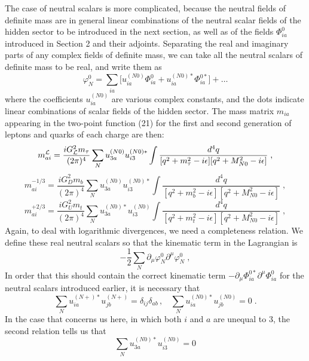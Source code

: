 The case of neutral scalars is more complicated, because the neutral fields  of definite mass are in general linear combinations of the neutral scalar fields of the hidden sector to be introduced in the next section, as well as of the fields $\Phi_{ia}^0$ introduced in Section 2 and their adjoints.  Separating the real and imaginary parts of any complex fields of definite mass, we can take all the neutral scalars of definite mass to be real, and write them as
\begin{equation}
  \varphi_N^0=\sum_{ia}\Big[u_{ia}^{(N0)} \Phi_{ia}^0+u_{ia}^{(N0)*} \Phi_{ia}^{0*}\Big]+\dots
\end{equation}
where the coefficients $u_{ia}^{(N0)}$ are various complex constants, and the dots indicate linear combinations of scalar fields of the hidden sector.
The mass matrix $m_{ia}$ appearing in the two-point function (21) for the first and second generation of leptons and quarks of each charge are then:
\begin{equation}
m^{\cal L}_{ai}=\frac{iG_{\cal L}^2m_\tau}{(2\pi)^4}\sum_{N}  u_{3a}^{(N0)}u_{i3}^{(N0)*} \int \frac{d^4q}{[q^2+m_\tau^2-i\epsilon][q^2+M_{N0}^2-i\epsilon]}\;,
\end{equation}
\begin{equation}
m^{-1/3}_{ai}=\frac{iG^2_Dm_b}{(2\pi)^4}\sum_{N}  u_{3a}^{(N0)}u_{i3}^{(N0)*} \int \frac{d^4q}{[q^2+m_b^2-i\epsilon][q^2+M_{N0}^2-i\epsilon]}\;,
\end{equation}
\begin{equation}
m^{+2/3}_{ai}=\frac{iG^2_Um_t}{(2\pi)^4}\sum_{N}  u_{3a}^{(N0)*}u_{i3}^{(N0)} \int \frac{d^4q}{[q^2+m_t^2-i\epsilon][q^2+M_{N0}^2-i\epsilon]}\;,
\end{equation}
Again, to deal with logarithmic divergences, we need a completeness relation.
We define these real neutral scalars so that the kinematic term
 in the Lagrangian is   
$$-\frac{1}{2}\sum_N\partial_\mu\varphi^{0}_N\partial^\mu\varphi^0_N\;,$$
In order that this should contain the correct kinematic term $-\partial_\mu\Phi_{ia}^{0*}\partial^\mu\Phi_{ia}^{0}$ for the neutral scalars introduced earlier, it is necessary that 
\begin{equation}
\sum_{N}  u_{ia}^{(N+)*}u_{jb}^{(N+)}=\delta_{ij}\delta_{ab}\,,~~~~
\sum_{N}  u_{ia}^{(N0)*}u_{jb}^{(N0)}=0
\;.
\end{equation}
In the case that concerns us here, in which both $i$ and $a$ are unequal to 3, the second relation tells us that
\begin{equation}
\sum_{N}  u_{3a}^{(N0)*}u_{i3}^{(N0)}=0
\end{equation}
